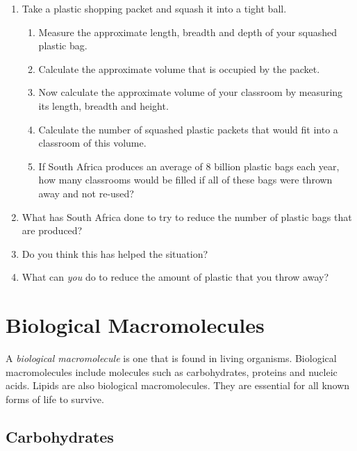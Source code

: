 {\begin{enumerate}
\item{Take a plastic shopping packet and squash it into a tight ball.} 
	\begin{enumerate}
	\item{Measure the approximate length, breadth and depth of your squashed plastic bag.}
	\item{Calculate the approximate volume that is occupied by the packet.}
	\item{Now calculate the approximate volume of your classroom by measuring its length, breadth and height.}
	\item{Calculate the number of squashed plastic packets that would fit into a classroom of this volume.}
	\item{If South Africa produces an average of 8 billion plastic bags each year, how many classrooms would be filled if all of these bags were thrown away and not re-used?}
	\end{enumerate}
\item{What has South Africa done to try to reduce the number of plastic bags that are produced?}
\item{Do you think this has helped the situation?}
\item{What can \textit{you} do to reduce the amount of plastic that you throw away?}
\end{enumerate}
}






\section{Biological Macromolecules}
\label{sec:orgmac:bm}

A \textit{biological macromolecule} is one that is found in living organisms. Biological macromolecules include molecules such as carbohydrates, proteins and nucleic acids. Lipids are also biological macromolecules. They are essential for all known forms of life to survive.


\subsection{Carbohydrates}
\label{subsec:orgmac:carbohydrates}

